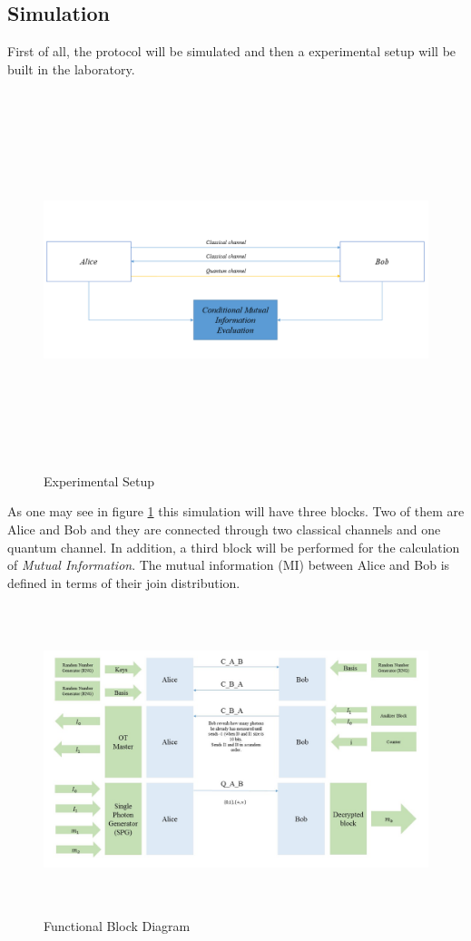 \subsection{Simulation}

First of all, the protocol will be simulated and then a experimental setup will be built in the laboratory.

\begin{figure}[H]
	\centering
	\includegraphics[width=1.0\textwidth, height=11cm]{./sdf/ot_with_discrete_variables/figures/SetupOt.png}
	\caption{Experimental Setup}\label{experimentalsetup}
\end{figure}

As one may see in figure \ref{experimentalsetup} this simulation will have three blocks. Two of them are Alice and Bob and they are connected through two classical channels and one quantum channel. In addition, a third block will be performed for the calculation of \textit{Mutual Information}. The mutual information (MI) between Alice and Bob is defined in terms of their join distribution.

\begin{figure}[h]
	\centering \includegraphics[width=1.1\textwidth,height=9cm]{./sdf/ot_with_discrete_variables/figures/DiagramBlock_Simulation.jpg}
	\caption{Functional Block Diagram}\label{functionalblockdiagram}
\end{figure}

